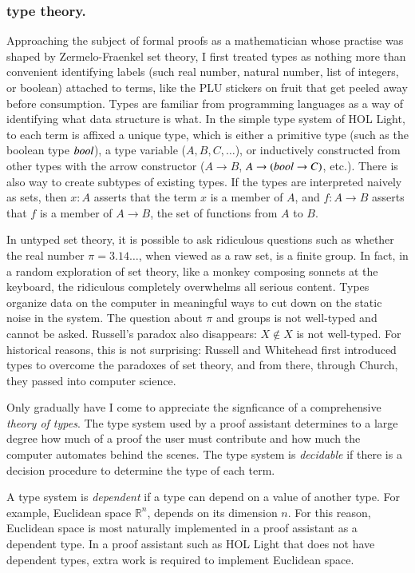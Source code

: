 \documentclass{llncs}
\def\op#1{{\hbox{#1}}}
\newcommand{\ring}[1]{\mathbb{#1}}
\begin{document}
\subsubsection{type theory.}

Approaching the subject of formal proofs as a mathematician whose
practise was shaped by Zermelo-Fraenkel set theory, I first treated
types as nothing more than convenient identifying labels (such real
number, natural number, list of integers, or boolean) attached to terms,
like the 
PLU stickers on fruit that get peeled
away before consumption.  Types are familiar from programming
languages as a way of identifying what data structure is what.  In the
simple type system of HOL Light, to each term is affixed a unique
type, which is either a primitive type (such as the boolean type
$\op{\it bool}$), a type variable ($A,B,C,\ldots$), or inductively
constructed from other types with the arrow constructor
($A\rightarrow B$, $A\rightarrow (\op{\it bool} \rightarrow C)$,
etc.).  There is also way to create subtypes of existing types.
If the types are interpreted naively as sets, then $x:A$
asserts that the term $x$ is a member of $A$, and $f:A\rightarrow B$
asserts that $f$ is a member of $A\rightarrow B$, the set of functions
from $A$ to $B$.

In untyped set theory, it is possible to ask ridiculous questions such
as whether the real number $\pi=3.14\ldots$, when viewed as a raw set,
is a finite group.  In fact, in a random exploration of set theory,
like a monkey composing sonnets at the keyboard, the ridiculous
completely overwhelms all serious content.  Types organize data on the
computer in meaningful ways to cut down on the static noise in the
system.  The question about $\pi$ and groups is not well-typed and
cannot be asked.  Russell's paradox also disappears: $X \not\in X$ is
not well-typed.  For historical reasons, this is not surprising:
Russell and Whitehead first introduced types to overcome the paradoxes of
set theory, and from there, through Church, they passed into computer
science.


Only gradually have I come to appreciate the signficance of a
comprehensive {\it theory of types}.  The type system used by a proof
assistant determines to a large degree how much of a proof the user
must contribute and how much the computer automates behind the scenes.
The type system is {\it decidable} if there is a decision procedure to
determine the type of each term.

A type system is {\it dependent} if a type can depend on a value of
another type.  For example, Euclidean space $\ring{R}^n$, depends on
its dimension $n$.  For this reason, Euclidean space is most naturally
implemented in a proof assistant as a dependent type.  
In a proof assistant such as HOL Light that does not have dependent types,
extra work is required to implement Euclidean space.
\end{document}
